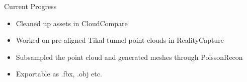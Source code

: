 





\begin{frame}{Current Progress}
     \begin{itemize}
        \item Cleaned up assets in CloudCompare
        \item Worked on pre-aligned Tikal tunnel point clouds in RealityCapture
        \item Subsampled the point cloud and generated meshes through PoissonRecon
        \item Exportable as .fbx, .obj etc.
    \end{itemize}    
\end{frame}

